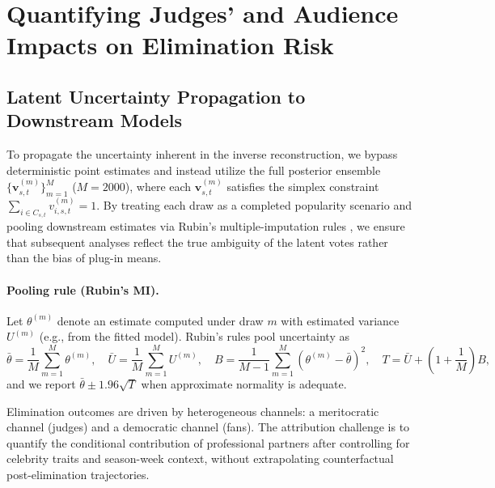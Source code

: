 
\section{Quantifying Judges' and Audience Impacts on Elimination Risk}

\label{sec:q3}

\subsection{Latent Uncertainty Propagation to Downstream Models }
\label{sec:q3_inputs}

To propagate the uncertainty inherent in the inverse reconstruction, we bypass deterministic point estimates and instead utilize the full posterior ensemble $\{\mathbf v^{(m)}_{s,t}\}_{m=1}^{M}$ ($M=2000$), where each $\mathbf v^{(m)}_{s,t}$ satisfies the simplex constraint $\sum_{i\in C_{s,t}} v^{(m)}_{i,s,t}=1$. By treating each draw as a completed popularity scenario and pooling downstream estimates via Rubin's multiple-imputation rules , we ensure that subsequent analyses reflect the true ambiguity of the latent votes rather than the bias of plug-in means.
\paragraph{Pooling rule (Rubin's MI).}
Let $\theta^{(m)}$ denote an estimate computed under draw $m$ with estimated variance $U^{(m)}$ (e.g., from the fitted model). Rubin's rules pool uncertainty as
\[
\bar\theta=\frac{1}{M}\sum_{m=1}^M \theta^{(m)},\quad
\bar U=\frac{1}{M}\sum_{m=1}^M U^{(m)},\quad
B=\frac{1}{M-1}\sum_{m=1}^M\left(\theta^{(m)}-\bar\theta\right)^2,\quad
T=\bar U+\left(1+\frac{1}{M}\right)B,
\]
and we report $\bar\theta\pm 1.96\sqrt{T}$ when approximate normality is adequate.


\begin{definition}
Elimination outcomes are driven by heterogeneous channels: a meritocratic channel (judges) and a democratic channel (fans).
The attribution challenge is to quantify the conditional contribution of professional partners after controlling for celebrity traits and season-week context,
without extrapolating counterfactual post-elimination trajectories.
\end{definition}

